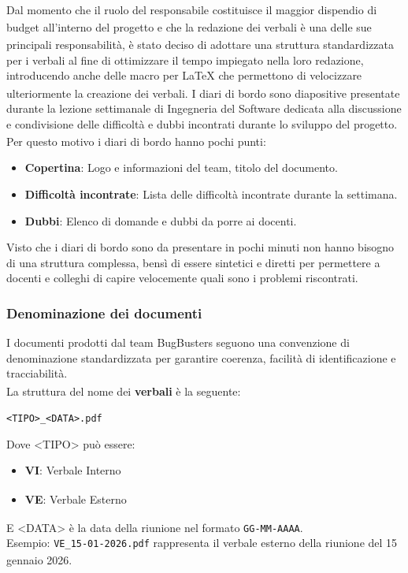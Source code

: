 \documentclass[a4paper,11pt]{article}
\newcommand{\G}{\textsubscript{\scalebox{0.6}{\textbf{G}}}}
\begin{document}
Dal momento che il ruolo del responsabile\G{} costituisce il maggior dispendio di budget all'interno del progetto\G{} e che la redazione dei verbali è una delle sue principali responsabilità,
è stato deciso di adottare una struttura standardizzata per i verbali al fine di ottimizzare il tempo impiegato nella loro redazione, introducendo anche delle macro per LaTeX\G{} che permettono di velocizzare ulteriormente la creazione dei verbali.
I diari di bordo sono diapositive presentate durante la lezione settimanale di Ingegneria del Software dedicata alla
discussione e condivisione delle difficoltà e dubbi incontrati durante lo sviluppo del progetto\G{}. 
Per questo motivo i diari di bordo hanno pochi punti:
\begin{itemize}
    \item \textbf{Copertina}: Logo e informazioni del team, titolo del documento.
    \item \textbf{Difficoltà incontrate}: Lista delle difficoltà incontrate durante la settimana.
    \item \textbf{Dubbi}: Elenco di domande e dubbi da porre ai docenti.
\end{itemize}
Visto che i diari di bordo sono da presentare in pochi minuti non hanno bisogno di una struttura complessa, bensì di essere 
sintetici e diretti per permettere a docenti e colleghi di capire velocemente quali sono i problemi riscontrati.


\subsubsection{Denominazione dei documenti}
I documenti prodotti dal team BugBusters seguono una convenzione di denominazione standardizzata per garantire coerenza, 
facilità di identificazione e tracciabilità\G{}. \\

La struttura del nome dei \textbf{verbali} è la seguente:
\begin{center}
\texttt{<TIPO>\_<DATA>.pdf}
\end{center}
Dove <TIPO> può essere:
\begin{itemize}
    \item \textbf{VI}: Verbale Interno\G{}
    \item \textbf{VE}: Verbale Esterno\G{}
\end{itemize}
E <DATA> è la data della riunione nel formato \texttt{GG-MM-AAAA}. \\
Esempio: \texttt{VE\_15-01-2026.pdf} rappresenta il verbale esterno\G{} della riunione del 15 gennaio 2026. \\
\end{document}
